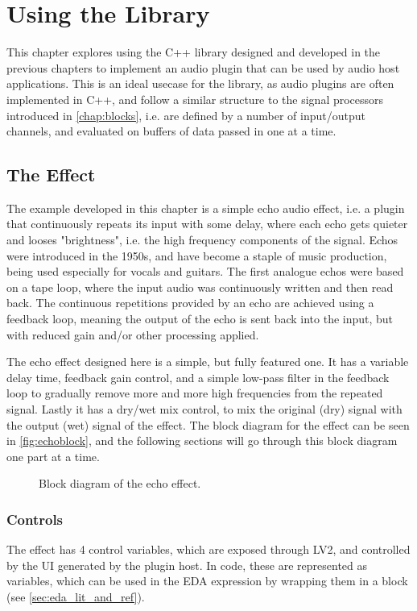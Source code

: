 \chapter{Using the Library}
\label{chap:echo}

This chapter explores using the C++ library designed and developed in the previous chapters to implement an
audio plugin that can be used by audio host applications. This is an ideal usecase for the library, as audio
plugins are often implemented in C++, and follow a similar structure to the signal processors introduced in
\autoref{chap:blocks}, i.e. are defined by a number of input/output channels, and evaluated on buffers of
data passed in one at a time.

\section{The Effect}

The example developed in this chapter is a simple echo audio effect, i.e. a plugin that continuously repeats
its input with some delay, where each echo gets quieter and looses "brightness", i.e. the high frequency
components of the signal. Echos were introduced in the 1950s, and have become a staple of music production,
being used especially for vocals and guitars. The first analogue echos were based on a tape loop, where the
input audio was continuously written and then read back. The continuous repetitions provided by an echo are
achieved using a feedback loop, meaning the output of the echo is sent back into the input, but with reduced
gain and/or other processing applied.

The echo effect designed here is a simple, but fully featured one. It has a variable delay time, feedback
gain control, and a simple low-pass filter in the feedback loop to gradually remove more and more high
frequencies from the repeated signal. Lastly it has a dry/wet mix control, to mix the original (dry) signal
with the output (wet) signal of the effect. The block diagram for the effect can be seen in
\autoref{fig:echoblock}, and the following sections will go through this block diagram one part at a time.

\begin{figure}
  \centering
  
  \caption{Block diagram of the echo effect.}
  \label{fig:echoblock}
\end{figure}

\subsection{Controls}
The effect has 4 control variables, which are exposed through LV2, and controlled by the UI generated by the
plugin host. In code, these are represented as  variables, which can be used in the EDA
expression by wrapping them in a  block (see \autoref{sec:eda_lit_and_ref}).

